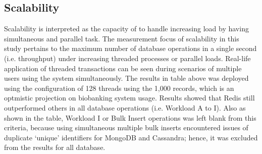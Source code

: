 \documentclass[5p]{elsarticle}
\begin{document}
\begin{figure}[!h]
{           \label{performance.workloadc}
         }
\end{figure}



\subsection{Scalability}
Scalability is interpreted as the capacity of to   handle increasing load by having simultaneous and parallel task. 
The measurement focus of scalability in this study pertains to the maximum number of database operations in a single second (i.e. throughput) 
under increasing threaded processes or parallel loads.  Real-life application of threaded transactions can be seen during scenarios of multiple 
users using the system simultaneously. The results in table above was deployed using the configuration of 128 threads 
using the 1,000 records, which is an optmistic projection on biobanking system usage. 
Results showed that Redis still outperformed others in all database operations (i.e. Workload A to I).  
Also as shown in the table, Workload I or Bulk Insert operations was left blank from this criteria, because using simultaneous multiple bulk inserts 
encountered issues of duplicate ‘unique’ identifiers for MongoDB and Cassandra; hence, it was excluded from the results for all database.\newline
\end{document}
